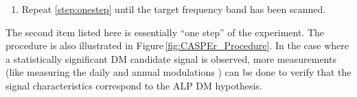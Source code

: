 \begin{enumerate}[label = (\arabic*)]
\begin{itemize}[label={}]
        \item G. If a DM candidate is found, further analysis on the candidate is performed and the measurement at this frequency is repeated. 
        \item H. If no DM candidates is found, certain ALP couplings strength can be excluded for the given mass. 
    \end{itemize}
    Note that after taking data, the value of the field can be incremented for the next step of the scan;
    \label{step:onestep} 
    \item Repeat \ref{step:onestep} until the target frequency band has been scanned. 
\end{enumerate}
The second item listed here is essentially ``one step'' of the experiment. The procedure is also illustrated in Figure\,\ref{fig:CASPEr_Procedure}. In the case where a statistically significant DM candidate signal is observed, more measurements (like measuring the daily and annual modulations \cite{Gramolin2022_SpectralPhysRevD}) can be done to verify that the signal characteristics correspond to the ALP DM hypothesis. 

